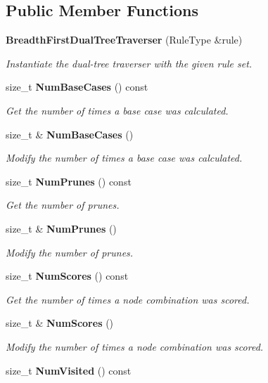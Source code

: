 \subsection*{Public Member Functions}
\begin{DoxyCompactItemize}
\item 
\textbf{ Breadth\+First\+Dual\+Tree\+Traverser} (Rule\+Type \&rule)
\begin{DoxyCompactList}\small\item\em Instantiate the dual-\/tree traverser with the given rule set. \end{DoxyCompactList}\item 
size\+\_\+t \textbf{ Num\+Base\+Cases} () const
\begin{DoxyCompactList}\small\item\em Get the number of times a base case was calculated. \end{DoxyCompactList}\item 
size\+\_\+t \& \textbf{ Num\+Base\+Cases} ()
\begin{DoxyCompactList}\small\item\em Modify the number of times a base case was calculated. \end{DoxyCompactList}\item 
size\+\_\+t \textbf{ Num\+Prunes} () const
\begin{DoxyCompactList}\small\item\em Get the number of prunes. \end{DoxyCompactList}\item 
size\+\_\+t \& \textbf{ Num\+Prunes} ()
\begin{DoxyCompactList}\small\item\em Modify the number of prunes. \end{DoxyCompactList}\item 
size\+\_\+t \textbf{ Num\+Scores} () const
\begin{DoxyCompactList}\small\item\em Get the number of times a node combination was scored. \end{DoxyCompactList}\item 
size\+\_\+t \& \textbf{ Num\+Scores} ()
\begin{DoxyCompactList}\small\item\em Modify the number of times a node combination was scored. \end{DoxyCompactList}\item 
size\+\_\+t \textbf{ Num\+Visited} () const

\end{DoxyCompactItemize}
